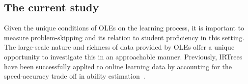 \documentclass{edm_article}
\begin{document}



\subsection{The current study}
Given the unique conditions of OLEs on the learning process, it is important to measure problem-skipping and its relation to student proficiency in this setting. The large-scale nature and richness of data provided by OLEs offer a unique opportunity to investigate this in an approachable manner. Previously, IRTrees have been successfully applied to online learning data by accounting for the speed-accuracy trade off in ability estimation~\cite{coomans2016distinguishing}. 
\end{document}
